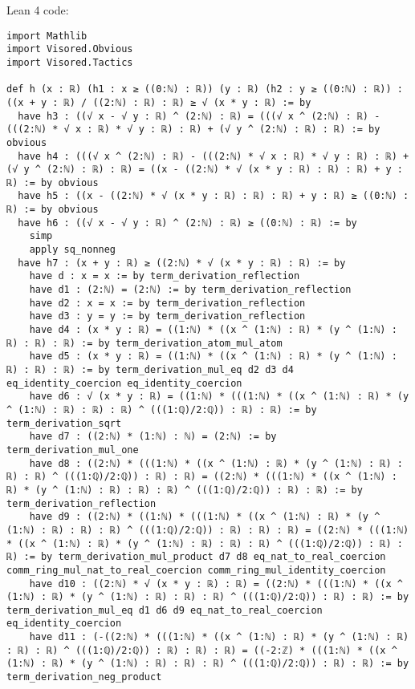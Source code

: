 \documentclass{article}
\begin{document}
Lean 4 code:
\begin{tcolorbox}[colback=white!10, width=\linewidth]
\begin{lstlisting}[language=Lean4]
import Mathlib
import Visored.Obvious
import Visored.Tactics

def h (x : ℝ) (h1 : x ≥ ((0:ℕ) : ℝ)) (y : ℝ) (h2 : y ≥ ((0:ℕ) : ℝ)) : ((x + y : ℝ) / ((2:ℕ) : ℝ) : ℝ) ≥ √ (x * y : ℝ) := by
  have h3 : ((√ x - √ y : ℝ) ^ (2:ℕ) : ℝ) = (((√ x ^ (2:ℕ) : ℝ) - (((2:ℕ) * √ x : ℝ) * √ y : ℝ) : ℝ) + (√ y ^ (2:ℕ) : ℝ) : ℝ) := by obvious
  have h4 : (((√ x ^ (2:ℕ) : ℝ) - (((2:ℕ) * √ x : ℝ) * √ y : ℝ) : ℝ) + (√ y ^ (2:ℕ) : ℝ) : ℝ) = ((x - ((2:ℕ) * √ (x * y : ℝ) : ℝ) : ℝ) + y : ℝ) := by obvious
  have h5 : ((x - ((2:ℕ) * √ (x * y : ℝ) : ℝ) : ℝ) + y : ℝ) ≥ ((0:ℕ) : ℝ) := by obvious
  have h6 : ((√ x - √ y : ℝ) ^ (2:ℕ) : ℝ) ≥ ((0:ℕ) : ℝ) := by
    simp
    apply sq_nonneg
  have h7 : (x + y : ℝ) ≥ ((2:ℕ) * √ (x * y : ℝ) : ℝ) := by
    have d : x = x := by term_derivation_reflection
    have d1 : (2:ℕ) = (2:ℕ) := by term_derivation_reflection
    have d2 : x = x := by term_derivation_reflection
    have d3 : y = y := by term_derivation_reflection
    have d4 : (x * y : ℝ) = ((1:ℕ) * ((x ^ (1:ℕ) : ℝ) * (y ^ (1:ℕ) : ℝ) : ℝ) : ℝ) := by term_derivation_atom_mul_atom
    have d5 : (x * y : ℝ) = ((1:ℕ) * ((x ^ (1:ℕ) : ℝ) * (y ^ (1:ℕ) : ℝ) : ℝ) : ℝ) := by term_derivation_mul_eq d2 d3 d4 eq_identity_coercion eq_identity_coercion
    have d6 : √ (x * y : ℝ) = ((1:ℕ) * (((1:ℕ) * ((x ^ (1:ℕ) : ℝ) * (y ^ (1:ℕ) : ℝ) : ℝ) : ℝ) ^ (((1:ℚ)/2:ℚ)) : ℝ) : ℝ) := by term_derivation_sqrt
    have d7 : ((2:ℕ) * (1:ℕ) : ℕ) = (2:ℕ) := by term_derivation_mul_one
    have d8 : ((2:ℕ) * (((1:ℕ) * ((x ^ (1:ℕ) : ℝ) * (y ^ (1:ℕ) : ℝ) : ℝ) : ℝ) ^ (((1:ℚ)/2:ℚ)) : ℝ) : ℝ) = ((2:ℕ) * (((1:ℕ) * ((x ^ (1:ℕ) : ℝ) * (y ^ (1:ℕ) : ℝ) : ℝ) : ℝ) ^ (((1:ℚ)/2:ℚ)) : ℝ) : ℝ) := by term_derivation_reflection
    have d9 : ((2:ℕ) * ((1:ℕ) * (((1:ℕ) * ((x ^ (1:ℕ) : ℝ) * (y ^ (1:ℕ) : ℝ) : ℝ) : ℝ) ^ (((1:ℚ)/2:ℚ)) : ℝ) : ℝ) : ℝ) = ((2:ℕ) * (((1:ℕ) * ((x ^ (1:ℕ) : ℝ) * (y ^ (1:ℕ) : ℝ) : ℝ) : ℝ) ^ (((1:ℚ)/2:ℚ)) : ℝ) : ℝ) := by term_derivation_mul_product d7 d8 eq_nat_to_real_coercion comm_ring_mul_nat_to_real_coercion comm_ring_mul_identity_coercion
    have d10 : ((2:ℕ) * √ (x * y : ℝ) : ℝ) = ((2:ℕ) * (((1:ℕ) * ((x ^ (1:ℕ) : ℝ) * (y ^ (1:ℕ) : ℝ) : ℝ) : ℝ) ^ (((1:ℚ)/2:ℚ)) : ℝ) : ℝ) := by term_derivation_mul_eq d1 d6 d9 eq_nat_to_real_coercion eq_identity_coercion
    have d11 : (-((2:ℕ) * (((1:ℕ) * ((x ^ (1:ℕ) : ℝ) * (y ^ (1:ℕ) : ℝ) : ℝ) : ℝ) ^ (((1:ℚ)/2:ℚ)) : ℝ) : ℝ) : ℝ) = ((-2:ℤ) * (((1:ℕ) * ((x ^ (1:ℕ) : ℝ) * (y ^ (1:ℕ) : ℝ) : ℝ) : ℝ) ^ (((1:ℚ)/2:ℚ)) : ℝ) : ℝ) := by term_derivation_neg_product

\end{lstlisting}
\end{tcolorbox}
\end{document}
